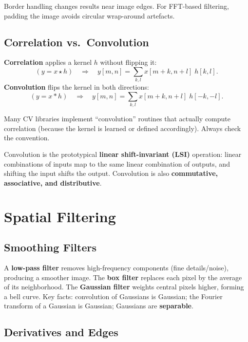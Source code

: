 \documentclass[11pt, oneside]{book}
\begin{document}
Border handling changes results near image edges. For FFT-based filtering, padding the image
avoids circular wrap-around artefacts.

\subsection{Correlation vs.\ Convolution}

\begin{defbox}[title={Correlation and Convolution}]
\textbf{Correlation} applies a kernel $h$ without flipping it:
\[
(y = x \star h)\quad\Rightarrow\quad
y[m,n] = \sum_{k,l} x[m+k,n+l]\;h[k,l].
\]
\textbf{Convolution} flips the kernel in both directions:
\[
(y = x * h)\quad\Rightarrow\quad
y[m,n] = \sum_{k,l} x[m+k,n+l]\;h[-k,-l].
\]
\end{defbox}

Many CV libraries implement ``convolution'' routines that actually compute correlation
(because the kernel is learned or defined accordingly). Always check the convention.

Convolution is the prototypical \textbf{linear shift-invariant (LSI)} operation: linear combinations of inputs
map to the same linear combination of outputs, and shifting the input shifts the output.
Convolution is also \textbf{commutative, associative, and distributive}.

\section{Spatial Filtering}

\subsection{Smoothing Filters}

\begin{defbox}[title={Low-Pass Filters}]
A \textbf{low-pass filter} removes high-frequency components (fine details/noise), producing a smoother image.
The \textbf{box filter} replaces each pixel by the average of its neighborhood.
The \textbf{Gaussian filter} weights central pixels higher, forming a bell curve.
Key facts: convolution of Gaussians is Gaussian; the Fourier transform of a Gaussian is Gaussian; Gaussians are \textbf{separable}.
\end{defbox}

\subsection{Derivatives and Edges}
\end{document}
